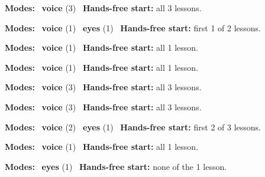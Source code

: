 \expandafter\def\csname hlchaptermodality123\endcsname{%
  {\small\noindent
    \textbf{Modes:} \hlvoicesign{}~\textbf{voice} (3)\quad
    \hlvoicesign{}~\textbf{Hands-free start:} all 3 lessons.%
    \par}\medskip
}

\expandafter\def\csname hlchaptermodality124\endcsname{%
  {\small\noindent
    \textbf{Modes:} \hlvoicesign{}~\textbf{voice} (1) \quad \hlsightsign{}~\textbf{eyes} (1)\quad
    \hlvoicesign{}~\textbf{Hands-free start:} first 1 of 2 lessons.%
    \par}\medskip
}

\expandafter\def\csname hlchaptermodality125\endcsname{%
  {\small\noindent
    \textbf{Modes:} \hlvoicesign{}~\textbf{voice} (1)\quad
    \hlvoicesign{}~\textbf{Hands-free start:} all 1 lesson.%
    \par}\medskip
}

\expandafter\def\csname hlchaptermodality126\endcsname{%
  {\small\noindent
    \textbf{Modes:} \hlvoicesign{}~\textbf{voice} (1)\quad
    \hlvoicesign{}~\textbf{Hands-free start:} all 1 lesson.%
    \par}\medskip
}

\expandafter\def\csname hlchaptermodality127\endcsname{%
  {\small\noindent
    \textbf{Modes:} \hlvoicesign{}~\textbf{voice} (3)\quad
    \hlvoicesign{}~\textbf{Hands-free start:} all 3 lessons.%
    \par}\medskip
}

\expandafter\def\csname hlchaptermodality128\endcsname{%
  {\small\noindent
    \textbf{Modes:} \hlvoicesign{}~\textbf{voice} (3)\quad
    \hlvoicesign{}~\textbf{Hands-free start:} all 3 lessons.%
    \par}\medskip
}

\expandafter\def\csname hlchaptermodality129\endcsname{%
  {\small\noindent
    \textbf{Modes:} \hlvoicesign{}~\textbf{voice} (2) \quad \hlsightsign{}~\textbf{eyes} (1)\quad
    \hlvoicesign{}~\textbf{Hands-free start:} first 2 of 3 lessons.%
    \par}\medskip
}

\expandafter\def\csname hlchaptermodality130\endcsname{%
  {\small\noindent
    \textbf{Modes:} \hlvoicesign{}~\textbf{voice} (1)\quad
    \hlvoicesign{}~\textbf{Hands-free start:} all 1 lesson.%
    \par}\medskip
}

\expandafter\def\csname hlchaptermodality131\endcsname{%
  {\small\noindent
    \textbf{Modes:} \hlsightsign{}~\textbf{eyes} (1)\quad
    \hlvoicesign{}~\textbf{Hands-free start:} none of the 1 lesson.%
    \par}\medskip
}

